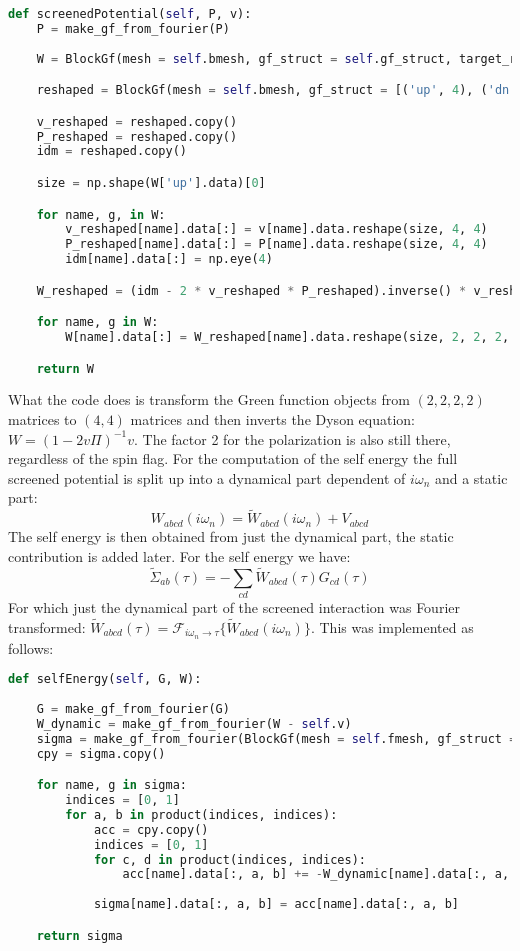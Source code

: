 \documentclass[12pt]{article}
\begin{document}
\begin{lstlisting}[language=Python]
def screenedPotential(self, P, v):
    P = make_gf_from_fourier(P)
        
    W = BlockGf(mesh = self.bmesh, gf_struct = self.gf_struct, target_rank = 4)

    reshaped = BlockGf(mesh = self.bmesh, gf_struct = [('up', 4), ('dn', 4)], target_rank = 2)

    v_reshaped = reshaped.copy()
    P_reshaped = reshaped.copy()
    idm = reshaped.copy()

    size = np.shape(W['up'].data)[0]

    for name, g, in W:
        v_reshaped[name].data[:] = v[name].data.reshape(size, 4, 4)
        P_reshaped[name].data[:] = P[name].data.reshape(size, 4, 4)
        idm[name].data[:] = np.eye(4)

    W_reshaped = (idm - 2 * v_reshaped * P_reshaped).inverse() * v_reshaped

    for name, g in W:
        W[name].data[:] = W_reshaped[name].data.reshape(size, 2, 2, 2, 2)

    return W
\end{lstlisting}
\newpage
\noindent
What the code does is transform the Green function objects from $(2, 2, 2, 2)$ matrices to $(4, 4)$ matrices and then inverts the Dyson equation: $W=(1-2v\Pi)^{-1}v$. The factor 2 for the polarization is also still there, regardless of the spin flag. For the computation of the self energy the full screened potential is split up into a dynamical part dependent of $i\omega_n$ and a static part:
\begin{equation}
W_{abcd}(i\omega_n)=\tilde{W}_{abcd}(i\omega_n)+V_{abcd}
\end{equation}
The self energy is then obtained from just the dynamical part, the static contribution is added later. For the self energy we have:
\begin{equation}
\tilde{\Sigma}_{ab}(\tau)=-\sum_{cd}\tilde{W}_{abcd}(\tau)G_{cd}(\tau)
\end{equation}
For which just the dynamical part of the screened interaction was Fourier transformed: $\tilde{W}_{abcd}(\tau)=\mathcal{F}_{i\omega_n\to\tau}\{\tilde{W}_{abcd}(i\omega_n)\}$. This was implemented as follows:
\begin{lstlisting}[language=Python]
def selfEnergy(self, G, W):
        
    G = make_gf_from_fourier(G)     
    W_dynamic = make_gf_from_fourier(W - self.v)
    sigma = make_gf_from_fourier(BlockGf(mesh = self.fmesh, gf_struct = self.gf_struct, target_rank = 2))
    cpy = sigma.copy()

    for name, g in sigma:
        indices = [0, 1]
        for a, b in product(indices, indices):
            acc = cpy.copy()          
            indices = [0, 1]
            for c, d in product(indices, indices):
                acc[name].data[:, a, b] += -W_dynamic[name].data[:, a, c, b, d] * G[name].data[:, c, d]
                
            sigma[name].data[:, a, b] = acc[name].data[:, a, b]

    return sigma
\end{lstlisting}
\end{document}
